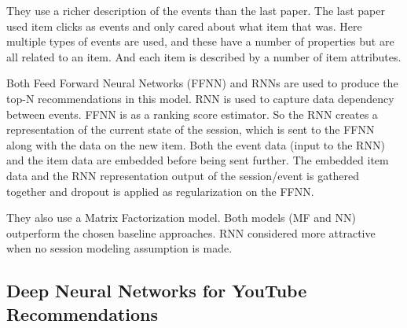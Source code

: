 They use a richer description of the events than the last paper. The last paper used item clicks as events and only cared about what item that was. Here multiple types of events are used, and these have a number of properties but are all related to an item. And each item is described by a number of item attributes. 

Both Feed Forward Neural Networks (FFNN) and RNNs are used to produce the top-N recommendations in this model. RNN is used to capture data dependency between events. FFNN is as a ranking score estimator. So the RNN creates a representation of the current state of the session, which is sent to the FFNN along with the data on the new item. Both the event data (input to the RNN) and the item data are embedded before being sent further. The embedded item data and the RNN representation output of the session/event is gathered together and dropout is applied as regularization on the FFNN. 

They also use a Matrix Factorization model.  Both models (MF and NN) outperform the chosen baseline approaches. RNN considered more attractive when no session modeling assumption is made.


\subsection{Deep Neural Networks for YouTube Recommendations}
